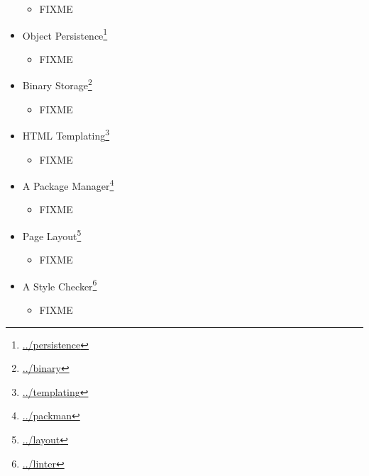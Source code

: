 \documentclass{scrbook}
\newcommand{\hreffoot}[2]{{#1}\footnote{\href{#2}{#2}}}
\begin{document}
\begin{itemize}
\begin{itemize}
\item FIXME

\end{itemize}



\item \hreffoot{Object Persistence}{../persistence}
\begin{itemize}

\item FIXME

\end{itemize}



\item \hreffoot{Binary Storage}{../binary}
\begin{itemize}

\item FIXME

\end{itemize}



\item \hreffoot{HTML Templating}{../templating}
\begin{itemize}

\item FIXME

\end{itemize}



\item \hreffoot{A Package Manager}{../packman}
\begin{itemize}

\item FIXME

\end{itemize}



\item \hreffoot{Page Layout}{../layout}
\begin{itemize}

\item FIXME

\end{itemize}



\item \hreffoot{A Style Checker}{../linter}
\begin{itemize}

\item FIXME

\end{itemize}




\end{itemize}
\end{document}
